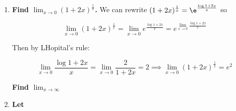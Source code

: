 \documentclass[10pt,a4paper]{article}
\begin{document}
\begin{enumerate}
    \item \textbf{Find $\lim_{x \to 0} (1 + 2x)^{\frac{1}{x}}$.}
        We can rewrite $(1 + 2x)^{\frac{1}{x}} = \e^{\frac{\log 1 + 2x}{x}}$ so 
        
        $$\lim_{x \to 0} (1 + 2x)^{\frac{1}{x}} = \lim_{x \to 0} e ^{\frac{\log 1 + 2x}{x}} = e^{\lim_{x \to 0}{\frac{\log 1 + 2x}{x}}} $$

        Then by LHopital's rule:

        $$\lim_{x \to 0}{\frac{\log 1 + 2x}{x}} =  \lim_{x \to 0}{\frac{2}{1+2x}} = 2 \implies \lim_{x \to 0} (1 + 2x)^{\frac{1}{x}} = e^2 $$

        \textbf{ Find $\lim_{x \to \infty}$ }

    \item \textbf{Let }

\end{enumerate}
\end{document}
